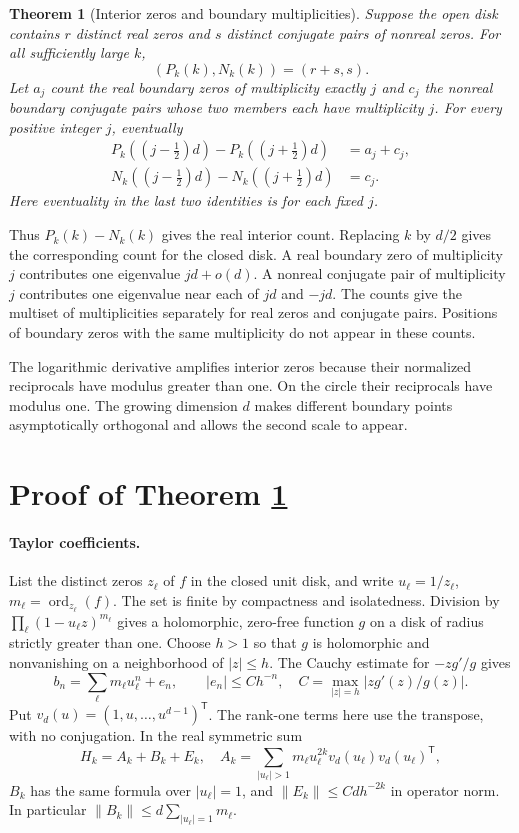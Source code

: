 \documentclass[11pt]{article}
\newtheorem{theorem}{Theorem}
\newcommand{\tr}{^{\mathsf T}}
\newcommand{\norm}[1]{\lVert #1\rVert}
\begin{document}
\begin{theorem}[Interior zeros and boundary multiplicities]\label{thm:main}
Suppose the open disk contains $r$ distinct real zeros and $s$ distinct conjugate pairs of nonreal zeros. For all sufficiently large $k$,
\[
 (P_k(k),N_k(k))=(r+s,s).
\]
Let $a_j$ count the real boundary zeros of multiplicity exactly $j$ and $c_j$ the nonreal boundary conjugate pairs whose two members each have multiplicity $j$. For every positive integer $j$, eventually
\begin{align}
 P_k((j-\tfrac12)d)-P_k((j+\tfrac12)d)&=a_j+c_j,\label{eq:p}\\
 N_k((j-\tfrac12)d)-N_k((j+\tfrac12)d)&=c_j.\label{eq:n}
\end{align}
Here eventuality in the last two identities is for each fixed $j$.
\end{theorem}
Thus $P_k(k)-N_k(k)$ gives the real interior count. Replacing $k$ by $d/2$ gives the corresponding count for the closed disk. A real boundary zero of multiplicity $j$ contributes one eigenvalue $jd+o(d)$. A nonreal conjugate pair of multiplicity $j$ contributes one eigenvalue near each of $jd$ and $-jd$. The counts give the multiset of multiplicities separately for real zeros and conjugate pairs. Positions of boundary zeros with the same multiplicity do not appear in these counts.

The logarithmic derivative amplifies interior zeros because their normalized reciprocals have modulus greater than one. On the circle their reciprocals have modulus one. The growing dimension $d$ makes different boundary points asymptotically orthogonal and allows the second scale to appear.

\section{Proof of Theorem \ref{thm:main}}
\paragraph{Taylor coefficients.}
List the distinct zeros $z_\ell$ of $f$ in the closed unit disk, and write $u_\ell=1/z_\ell$, $m_\ell=\operatorname{ord}_{z_\ell}(f)$. The set is finite by compactness and isolatedness. Division by $\prod_\ell (1-u_\ell z)^{m_\ell}$ gives a holomorphic, zero-free function $g$ on a disk of radius strictly greater than one. Choose $h>1$ so that $g$ is holomorphic and nonvanishing on a neighborhood of $|z|\le h$. The Cauchy estimate for $-zg'/g$ gives
\begin{equation}
 b_n=\sum_\ell m_\ell u_\ell^n + e_n,\qquad
 |e_n|\le C h^{-n},\quad C=\max_{|z|=h}|zg'(z)/g(z)|.
 \label{eq:moment}
\end{equation}
Put $v_d(u)=(1,u,\ldots,u^{d-1})\tr$. The rank-one terms here use the transpose, with no conjugation. In the real symmetric sum
\begin{equation}
 H_k=A_k+B_k+E_k,\quad
 A_k=\sum_{|u_\ell|>1} m_\ell u_\ell^{2k}v_d(u_\ell)v_d(u_\ell)\tr,
 \label{eq:decomp}
\end{equation}
$B_k$ has the same formula over $|u_\ell|=1$, and $\norm{E_k}\le Cd h^{-2k}$ in operator norm. In particular $\norm{B_k}\le d\sum_{|u_\ell|=1} m_\ell$.
\end{document}
